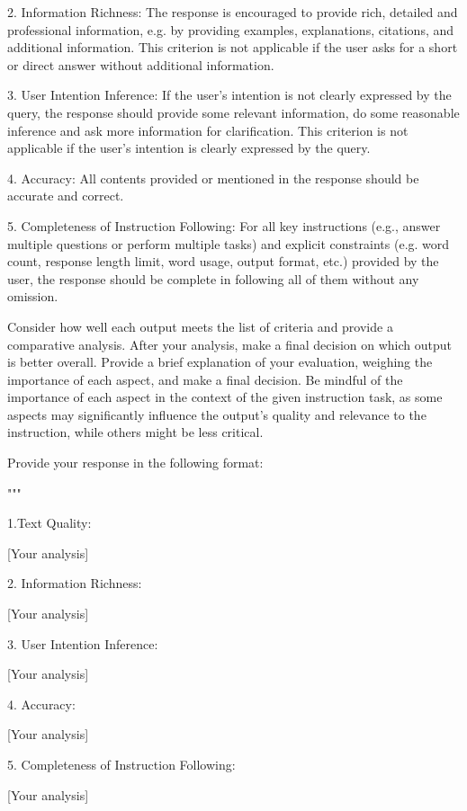 \begin{figure*}[t!]
\begin{tcolorbox}[colback=black!3!white, colframe=black!70!white, title=Multi-aspect-single, fontupper=\scriptsize, fonttitle=\footnotesize]
2. Information Richness: The response is encouraged to provide rich, detailed and professional information, e.g. by providing examples, explanations, citations, and additional information. This criterion is not applicable if the user asks for a short or direct answer without additional information.

3. User Intention Inference: If the user's intention is not clearly expressed by the query, the response should provide some relevant information, do some reasonable inference and ask more information for clarification. This criterion is not applicable if the user's intention is clearly expressed by the query.

4. Accuracy: All contents provided or mentioned in the response should be accurate and correct.

5. Completeness of Instruction Following: For all key instructions (e.g., answer multiple questions or perform multiple tasks) and explicit constraints (e.g. word count, response length limit, word usage, output format, etc.) provided by the user, the response should be complete in following all of them without any omission.
\newline

Consider how well each output meets the list of criteria and provide a comparative analysis.
After your analysis, make a final decision on which output is better overall. Provide a brief explanation of your evaluation, weighing the importance of each aspect, and make a final decision. Be mindful of the importance of each aspect in the context of the given instruction task, as some aspects may significantly influence the output's quality and relevance to the instruction, while others might be less critical.
\newline

Provide your response in the following format:

"""

1.Text Quality:

[Your analysis]

2. Information Richness:

[Your analysis]

3. User Intention Inference:

[Your analysis]

4. Accuracy:

[Your analysis]

5. Completeness of Instruction Following:

[Your analysis]
\newline


\end{tcolorbox}
\end{figure*}
